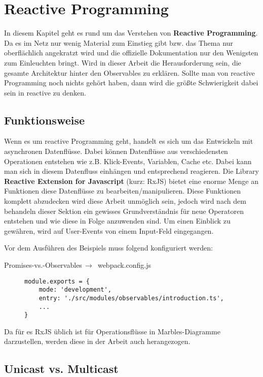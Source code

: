 \section{Reactive Programming}
In diesem Kapitel geht es rund um das Verstehen von \textbf{Reactive Programming}. Da es im Netz nur wenig Material zum Einstieg gibt bzw. das Thema nur oberflächlich angekratzt wird und die offizielle Dokumentation nur den Wenigsten zum Einleuchten bringt. Wird in dieser Arbeit die Herausforderung sein, die gesamte Architektur hinter den Observables zu erklären.
Sollte man von reactive Programming noch nichts gehört haben, dann wird die größte Schwierigkeit dabei sein in \glqq{}reactive\grqq{} zu denken.

\subsection{Funktionsweise}
Wenn es um reactive Programming geht, handelt es sich um das Entwickeln mit asynchronen Datenflüsse. Dabei können Datenflüsse aus verschiedensten Operationen entstehen wie z.B. Klick-Events, Variablen, Cache etc. Dabei kann man sich in diesem Datenfluss einhängen und entsprechend reagieren. Die Library \textbf{Reactive Extension for Javascript} (kurz: RxJS) bietet eine enorme Menge an Funktionen diese Datenflüsse zu bearbeiten/manipulieren. Diese Funktionen komplett abzudecken wird diese Arbeit unmöglich sein, jedoch wird nach dem behandeln dieser Sektion ein gewisses Grundverständnis für neue Operatoren entstehen und wie diese in Folge anzuwenden sind. Um einen Einblick zu gewähren, wird auf User-Events von einem Input-Feld eingegangen.

\noindent
Vor dem Ausführen des Beispiels muss folgend konfiguriert werden:

 \begin{center}
     Promises-vs.-Observables$\,\to\,$ webpack.config.js
 \end{center}

\begin{figure}[H]
\begin{lstlisting}
module.exports = {
    mode: 'development',
    entry: './src/modules/observables/introduction.ts',
    ...
}
\end{lstlisting}
\end{figure}

Da für es RxJS üblich ist für Operationsflüsse in Marbles-Diagramme darzustellen, werden diese in der Arbeit auch herangezogen.

\subsection{Unicast vs. Multicast}
